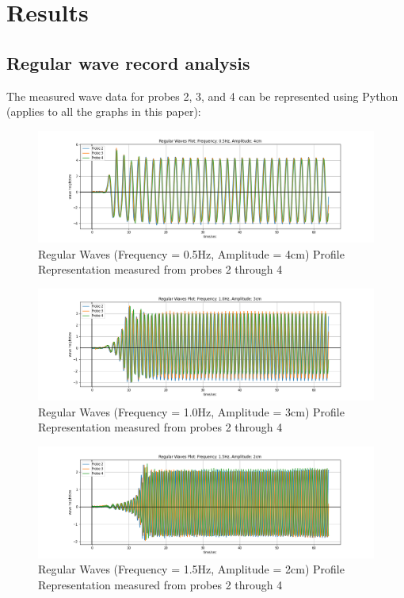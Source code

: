 \documentclass{article}
\begin{document}
	\section{Results}
	\subsection{Regular wave record analysis}
	The measured wave data for probes 2, 3, and 4 can be represented using Python \cite{code} (applies to all the graphs in this paper):\\
	\begin{figure}[H]
		\centering
		\includegraphics[clip, trim = {3.3cm 0.5cm 3.4cm 1cm},width=\textwidth]{../graphs/F05A4Graph.png}
		\caption{Regular Waves (Frequency = 0.5Hz, Amplitude = 4cm) Profile Representation measured from probes 2 through 4}
		\label{f05a4graph}
	\end{figure}
	\begin{figure}[H]
		\centering
		\includegraphics[clip, trim = {3.3cm 0 3.4cm 1cm}, width=\textwidth]{../graphs/F10A3Graph.png}
		\caption{Regular Waves (Frequency = 1.0Hz, Amplitude = 3cm) Profile Representation measured from probes 2 through 4}
		\label{f10a3graph}
	\end{figure}
	\begin{figure}[H]
		\centering
		\includegraphics[clip, trim = {3.3cm 0 3.4cm 1cm},width=\textwidth]{../graphs/F15A2Graph.png}
		\caption{Regular Waves (Frequency = 1.5Hz, Amplitude = 2cm) Profile Representation measured from probes 2 through 4}
		\label{f15a2graph}
	\end{figure}
\end{document}
